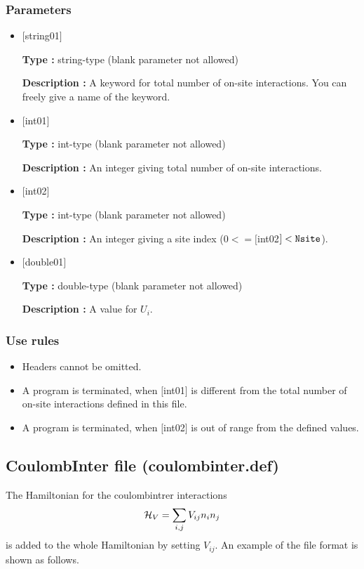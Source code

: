 \subsubsection{Parameters}
 \begin{itemize}

   \item  $[$string01$]$
   
    {\bf Type :} string-type (blank parameter not allowed)

   {\bf Description :} A keyword for total number of on-site interactions. You can freely give a name of the keyword.

   \item  $[$int01$]$
   
    {\bf Type :} int-type (blank parameter not allowed)

   {\bf Description :} An integer giving total number of on-site interactions.

  \item  $[$int02$]$
  
 {\bf Type :} int-type (blank parameter not allowed)

{\bf Description :} An integer giving a site index ($0<= [$int02$]<\verb|Nsite|$).
 
 \item  $[$double01$]$
   
   {\bf Type :} double-type (blank parameter not allowed)

  {\bf Description :}  A value for $U_i$.

\end{itemize}

\subsubsection{Use rules}
\begin{itemize}
\item Headers cannot be omitted. 
\item A program is terminated, when $[$int01$]$ is different from the total number of on-site interactions defined in this file.
\item A program is terminated, when $[$int02$]$ is out of range from the defined values.
\end{itemize}

\newpage
\subsection{CoulombInter file (coulombinter.def)}
The Hamiltonian for the coulombintrer interactions
\begin{equation}
{\cal H}_V = \sum_{i,j}V_{ij} n_ {i}n_{j}
\end{equation}
is added to the whole Hamiltonian by setting $V_{ij}$.
An example of the file format is shown as follows.

